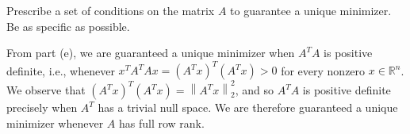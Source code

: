 Prescribe a set of conditions on the matrix $A$ to guarantee a unique minimizer. Be as specific as possible.

\begin{solution}
  From part (e), we are guaranteed a unique minimizer when $A^T A$ is positive definite, i.e., whenever 
  $x^T A^T A x = (A^T x)^T (A^T x) > 0$ for every nonzero $x \in \mathbb{R}^n$. We observe that 
  $(A^T x)^T (A^T x) = \left\lVert A^T x \right\rVert^2_2$, and so $A^T A$ is positive definite precisely when $A^T$ has a trivial
  null space. We are therefore guaranteed a unique minimizer whenever $A$ has full row rank.
  \ \\
\end{solution}
